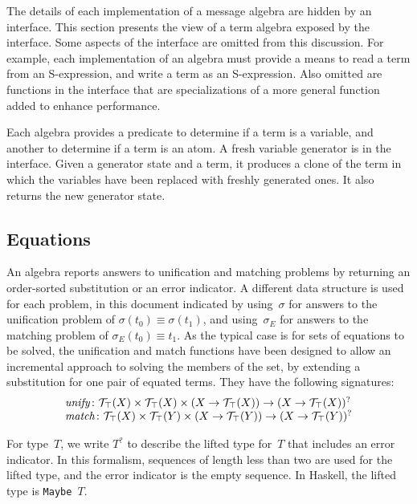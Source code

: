 \documentclass[12pt]{report}
\theoremstyle{definition}
\begin{document}
The details of each implementation of a {\cpsa} message algebra are
hidden by an interface.  This section presents the view of a term
algebra exposed by the interface.  Some aspects of the interface are
omitted from this discussion.  For example, each implementation of an
algebra must provide a means to read a term from an S-expression, and
write a term as an S-expression.  Also omitted are functions in the
interface that are specializations of a more general function added to
enhance performance.

Each algebra provides a predicate to determine if a term is a
variable, and another to determine if a term is an atom.  A fresh
variable generator is in the interface.  Given a generator state and a
term, it produces a clone of the term in which the variables have been
replaced with freshly generated ones.  It also returns the new
generator state.

\subsection{Equations}\label{sec:equations}

An algebra reports answers to unification and matching problems by
returning an order-sorted substitution or an error indicator.  A
different data structure is used for each problem, in this document
indicated by using~$\sigma$ for answers to the unification problem of
$\sigma(t_0)\equiv\sigma(t_1)$, and using~$\sigma_E$ for answers to the
matching problem of $\sigma_E(t_0)\equiv t_1$.  As the typical case is for
sets of equations to be solved, the unification and match functions
have been designed to allow an incremental approach to solving the
members of the set, by extending a substitution for one pair of
equated terms.  They have the following signatures:
$$\begin{array}{l}
\operatorname{\mathit{unify}}\colon
\mathcal{T}_\top(X)\times\mathcal{T}_\top(X)\times
(X\rightarrow\mathcal{T}_\top(X))\rightarrow
(X\rightarrow\mathcal{T}_\top(X))^?\\
\operatorname{\mathit{match}}\colon
\mathcal{T}_\top(X)\times\mathcal{T}_\top(Y)\times
(X\rightarrow\mathcal{T}_\top(Y))\rightarrow
(X\rightarrow\mathcal{T}_\top(Y))^?
\end{array}$$

For type~$T$, we write $T^?$ to describe the lifted type for~$T$ that
includes an error indicator.  In this formalism, sequences of length
less than two are used for the lifted type, and the error indicator is
the empty sequence.  In Haskell, the lifted type is
\texttt{Maybe~$T$}.
\end{document}
